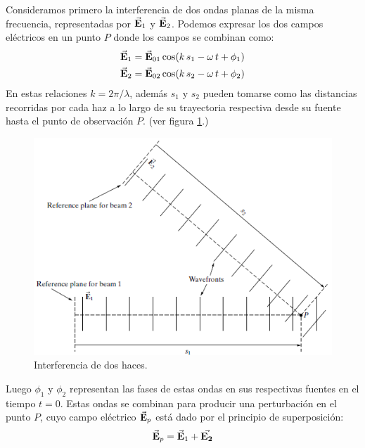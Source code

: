 \documentclass[14pt]{extarticle}
\begin{document}
Consideramos primero la interferencia de dos ondas planas de la misma frecuencia, representadas por $\va{E}_{1}$ y $\va{E}_{2}$. Podemos expresar los dos campos eléctricos en un punto $P$ donde los campos se combinan como:
\begin{eqnarray}
\va{E}_{1} &= \va{E}_{01} \cos (k \,s_{1} - \omega \, t + \phi_{1}) \label{eq:ecuacion_07_01} \\
\va{E}_{2} &= \va{E}_{02} \cos (k \,s_{2} - \omega \, t + \phi_{2}) \label{eq:ecuacion_07_02}
\end{eqnarray}
En estas relaciones $k = 2 \pi / \lambda$, además $s_{1}$ y $s_{2}$ pueden tomarse como las distancias recorridas por cada haz a lo largo de su trayectoria respectiva desde su fuente hasta el punto de observación $P$. (ver figura \ref{fig:figura_07_01}.)
\begin{figure}[H]
    \centering
    \includegraphics[scale=0.7]{Imagenes/Interferencia2_01.png}
    \caption{Interferencia de dos haces.}
    \label{fig:figura_07_01}
\end{figure}
Luego $\phi_{1}$ y $\phi_{2}$ representan las fases de estas ondas en sus respectivas fuentes en el tiempo $t = 0$. Estas ondas se combinan para producir una perturbación en el punto $P$, cuyo campo eléctrico $\va{E}_{p}$ está dado por el principio de superposición:
\begin{align*}
\va{E}_{p} = \va{E}_{1} + \va{E_{2}}
\end{align*}
\end{document}
